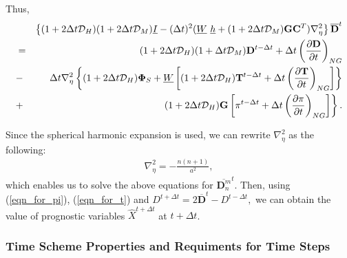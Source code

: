Thus,
\begin{eqnarray}
      & &\left\{ ( 1+2\Delta t {\mathcal D}_H )( 1+2\Delta t {\mathcal D}_M )
           \underline{I}
      - ( \Delta t )^{2}  ( \underline{W} \ \underline{h}
           + (1+2\Delta t {\mathcal D}_M)
             {\mathbf{G}} {\mathbf{C}}^{T} ) \nabla^{2}_{\eta}
  \right\}
      \overline{ {\mathbf{D}} }^{t} \\
  &=& ( 1+2\Delta t {\mathcal D}_H )( 1+\Delta t {\mathcal D}_M )
       {\mathbf{D}}^{t-\Delta t}
  + \Delta t
     \left( \frac{\partial {\mathbf{D}}}{\partial t} \right)_{NG}  \notag\\
  &-&  \Delta t \nabla^{2}_{\eta}
                   \left\{  ( 1+2\Delta t {\mathcal D}_H ) {\mathbf{\Phi}}_{S}
                          + \underline{W}
                            \left[ ( 1+2\Delta t {\mathcal D}_H )
                                    {\mathbf{T}}^{t-\Delta t}
                                  + \Delta t
                                      \left( \frac{\partial {\mathbf{T}}}
                                                  {\partial t}
                                      \right)_{NG} \right]
                   \right\} \notag \\
                 &+& \hspace{1.4cm} \left. ( 1+2\Delta t {\mathcal D}_H ) {\mathbf{G}}
                            \left[ \pi^{t-\Delta t}
                                  + \Delta t \left( \frac{\partial \pi}{\partial t}
                                  \right)_{NG}  \right]
                                  \right\}.
\end{eqnarray}

Since the spherical harmonic expansion is used, we can rewrite
\(\nabla_{\eta}^2\) as the following:
\begin{eqnarray}
\nabla_{\eta}^2=-\frac{n(n+1)}{a^2},
\end{eqnarray}
which enables us to solve the above equations for
\(\overline{ {\mathbf{D}}_n^m }^{t}\). Then, using (\ref{eqn_for_pi}),
(\ref{eqn_for_t}) and
\(D^{t+\Delta t} = 2\overline{ {\mathbf{D}} }^{t} - D^{t-\Delta t},\)
we can obtain the value of prognostic variables \(\hat{X}^{t+\Delta t}\)
at \(t+\Delta t\).

\hypertarget{time-scheme-properties-and-requiments-for-time-steps}{%
\subsubsection{Time Scheme Properties and Requiments for Time
Steps}\label{time-scheme-properties-and-requiments-for-time-steps}}

